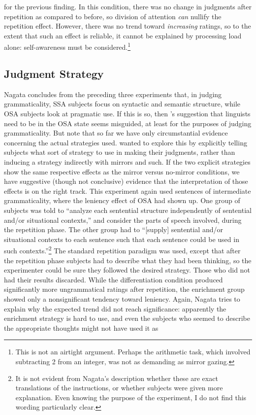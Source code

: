 for the previous  finding. In this condition, there was no change in judgments  after repetition as compared to before, so division of attention \textit{can} nullify the repetition effect. However, there was no trend toward \textit{increasing} ratings, so to the extent that
such an effect is reliable, it cannot be explained by processing load alone: self-awareness must be considered.\footnote{This is not an airtight argument. Perhaps the arithmetic task, which involved subtracting 2 from an integer, was not as demanding as mirror gazing.}

\subsection{Judgment Strategy}\label{sec:5.2.5}

Nagata concludes from the preceding three experiments that, in judging grammaticality, SSA subjects focus on syntactic and semantic structure, while OSA subjects look at pragmatic use. If this is so, then \citeauthor{CarrollEtAl1981}'s suggestion that linguists need to be in the OSA state seems misguided, at least for the purposes of judging grammaticality. But note that so far we have only circumstantial evidence concerning the actual strategies used. \citet{Nagata1989c} wanted to explore this by explicitly telling subjects what sort of strategy to use in making their judgments, rather than inducing a strategy indirectly with mirrors and such. If the two explicit strategies show the same respective effects as the mirror versus no-mirror conditions, we have suggestive (though not conclusive) evidence that the interpretation of those effects is on the right track. This experiment again used sentences of intermediate grammaticality, where the leniency effect of OSA had shown up. One group of subjects was told to ``analyze each sentential structure independently of sentential and/or situational contexts,'' and consider the parts of speech involved, during the repetition phase. The other group had to ``[supply] sentential and/or situational contexts to each sentence such that each sentence could be used in such contexts.''\footnote{It is not evident from Nagata's description whether these are exact translations of the instructions, or whether subjects were given more explanation. Even knowing the purpose of the experiment, I do not find this wording particularly clear.}
 The standard repetition paradigm was used, except that after the repetition phase subjects had to describe what they had been thinking, so the experimenter could be sure they followed the desired strategy. Those who did not had their results discarded. While the differentiation condition produced significantly more ungrammatical ratings after repetition, the enrichment group showed only a nonsignificant tendency toward leniency. Again, Nagata tries to explain why the expected trend did not reach significance: apparently the enrichment strategy is hard to use, and even the subjects who seemed to describe the appropriate thoughts might not have used it as
